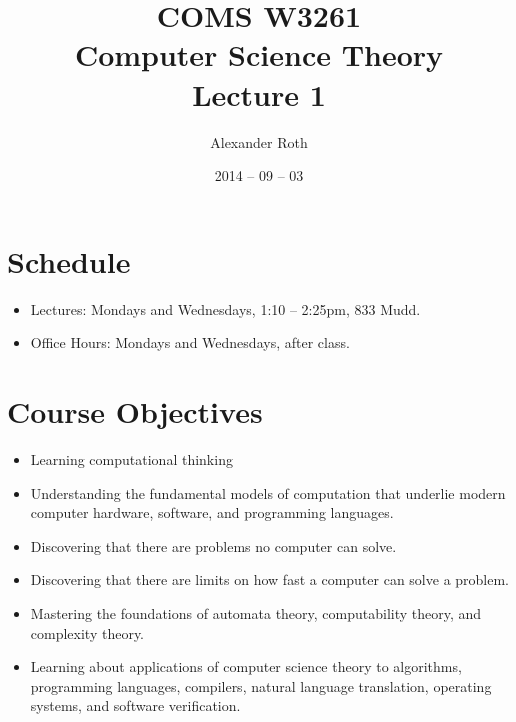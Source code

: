 \documentclass[]{article}
\begin{document}
\newtheorem{keyword}{Definition}
\newtheorem{example}{Example}

\title{COMS W3261 \\ Computer Science Theory \\ Lecture 1}
\author{Alexander Roth}
\date{2014 -- 09 -- 03}
\maketitle
\section{Schedule}
  \begin{itemize}
    \item Lectures: Mondays and Wednesdays, 1:10 -- 2:25pm, 833 Mudd.
    \item Office Hours: Mondays and Wednesdays, after class.
  \end{itemize}

\section{Course Objectives}
  \begin{itemize}
    \item Learning computational thinking
    \item Understanding the fundamental models of computation that underlie 
    modern computer hardware, software, and programming languages.
    \item Discovering that there are problems no computer can solve.
    \item Discovering that there are limits on how fast a computer can solve a 
    problem.
    \item Mastering the foundations of automata theory, computability theory, 
    and complexity theory.
    \item Learning about applications of computer science theory to algorithms, 
    programming languages, compilers, natural language translation, operating 
    systems, and software verification.
  \end{itemize}
\end{document}
